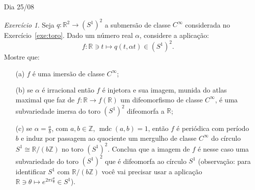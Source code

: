 \documentclass[oneside,11pt]{amsart}
\newcommand{\R}{\mathds R}
\newcommand{\Z}{\mathds Z}
\DeclareMathOperator{\mdc}{mdc}
\theoremstyle{remark}\newtheorem{exercise}{Exercício}[section]
\theoremstyle{plain}\newtheorem{teo}{Teorema}[section]
\theoremstyle{plain}\newtheorem{lem}[teo]{Lema}
\theoremstyle{plain}\newtheorem{prop}[teo]{Proposição}
\theoremstyle{definition}\newtheorem{defin}[teo]{Definição}
\theoremstyle{remark}\newtheorem{rem}[teo]{Observação}
\theoremstyle{definition}\newtheorem{example}[teo]{Exemplo}
\numberwithin{equation}{section}
\begin{document}
\begin{section}{Dia 25/08}
\begin{exercise}
Seja $q:\R^2\to(S^1)^2$ a submersão de classe $C^\infty$ considerada no Exercício~\ref{exe:toro}. Dado um número real $\alpha$, considere a aplicação:
\[f:\R\ni t\longmapsto q(t,\alpha t)\in(S^1)^2.\]
Mostre que:
\begin{itemize}
\item[(a)] $f$ é uma imersão de classe $C^\infty$;
\item[(b)] se $\alpha$ é irracional então $f$ é injetora e sua imagem, munida do atlas maximal que faz de $f:\R\to f(\R)$ um difeomorfismo de classe $C^\infty$,
é uma subvariedade imersa do toro $(S^1)^2$ difeomorfa a $\R$;
\item[(c)] se $\alpha=\frac ab$, com $a,b\in\Z$, $\mdc(a,b)=1$, então $f$ é periódica com período $b$ e induz por passagem ao quociente
um mergulho de classe $C^\infty$ do círculo $S^1\cong\R/(b\Z)$ no toro $(S^1)^2$. Conclua que a imagem de $f$ é nesse caso uma subvariedade do toro
$(S^1)^2$ que é difeomorfa ao círculo $S^1$ (observação: para identificar $S^1$ com $\R/(b\Z)$ você vai precisar usar a aplicação
$\R\ni\theta\mapsto e^{2\pi i\frac\theta b}\in S^1$).
\end{itemize}
\end{exercise}

\end{section}
\end{document}
